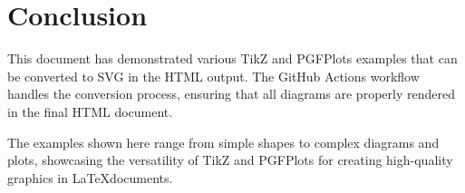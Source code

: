 \documentclass{article}
\begin{document}
\section{Conclusion}

This document has demonstrated various TikZ and PGFPlots examples that can be converted to SVG in the HTML output. The GitHub Actions workflow handles the conversion process, ensuring that all diagrams are properly rendered in the final HTML document.

The examples shown here range from simple shapes to complex diagrams and plots, showcasing the versatility of TikZ and PGFPlots for creating high-quality graphics in \LaTeX documents.
\end{document}
